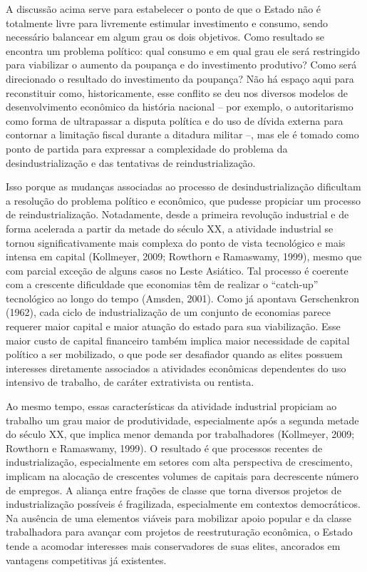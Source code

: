 A discussão acima serve para estabelecer o ponto de que o Estado não é
totalmente livre para livremente estimular investimento e consumo, sendo
necessário balancear em algum grau os dois objetivos. Como resultado se
encontra um problema político: qual consumo e em qual grau ele será
restringido para viabilizar o aumento da poupança e do investimento
produtivo? Como será direcionado o resultado do investimento da
poupança? Não há espaço aqui para reconstituir como, historicamente,
esse conflito se deu nos diversos modelos de desenvolvimento econômico
da história nacional -- por exemplo, o autoritarismo como forma de
ultrapassar a disputa política e do uso de dívida externa para contornar
a limitação fiscal durante a ditadura militar --, mas ele é tomado como
ponto de partida para expressar a complexidade do problema da
desindustrialização e das tentativas de reindustrialização.

Isso porque as mudanças associadas ao processo de desindustrialização
dificultam a resolução do problema político e econômico, que pudesse
propiciar um processo de reindustrialização. Notadamente, desde a
primeira revolução industrial e de forma acelerada a partir da metade do
século XX, a atividade industrial se tornou significativamente mais
complexa do ponto de vista tecnológico e mais intensa em capital
(Kollmeyer, 2009; Rowthorn e Ramaswamy, 1999), mesmo que com parcial
exceção de alguns casos no Leste Asiático. Tal processo é coerente com a
crescente dificuldade que economias têm de realizar o ``catch-up''
tecnológico ao longo do tempo (Amsden, 2001). Como já apontava
Gerschenkron (1962), cada ciclo de industrialização de um conjunto de
economias parece requerer maior capital e maior atuação do estado para
sua viabilização. Esse maior custo de capital financeiro também implica
maior necessidade de capital político a ser mobilizado, o que pode ser
desafiador quando as elites possuem interesses diretamente associados a
atividades econômicas dependentes do uso intensivo de trabalho, de
caráter extrativista ou rentista.

Ao mesmo tempo, essas características da atividade industrial propiciam
ao trabalho um grau maior de produtividade, especialmente após a segunda
metade do século XX, que implica menor demanda por trabalhadores
(Kollmeyer, 2009; Rowthorn e Ramaswamy, 1999). O resultado é que
processos recentes de industrialização, especialmente em setores com
alta perspectiva de crescimento, implicam na alocação de crescentes
volumes de capitais para decrescente número de empregos. A aliança entre
frações de classe que torna diversos projetos de industrialização
possíveis é fragilizada, especialmente em contextos democráticos. Na
ausência de uma elementos viáveis para mobilizar apoio popular e da
classe trabalhadora para avançar com projetos de reestruturação
econômica, o Estado tende a acomodar interesses mais conservadores de
suas elites, ancorados em vantagens competitivas já existentes.

